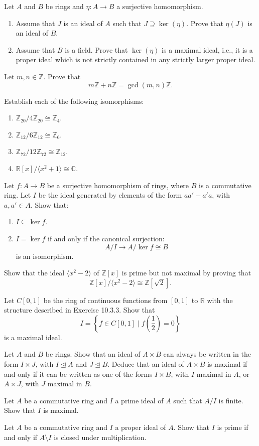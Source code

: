 \documentclass[
    11pt,a4paper,
]{exam}
\begin{document}
\begin{questions}
\question
Let $A$ and $B$ be rings and $\eta : A \to B$ a surjective homomorphism.
\begin{enumerate}[label=(\roman*)]
    \item Assume that $J$ is an ideal of $A$ such that $J \supseteq \ker(\eta)$. Prove that $\eta(J)$ is an ideal of $B$.
    \item Assume that $B$ is a field. Prove that $\ker(\eta)$ is a maximal ideal, i.e., it is a proper ideal which is not strictly contained in any strictly larger proper ideal.
\end{enumerate}

\question
Let $m, n \in \mathbb{Z}$. Prove that
\[
m\mathbb{Z} + n\mathbb{Z} = \gcd(m, n)\mathbb{Z}.
\]

\question
Establish each of the following isomorphisms:
\begin{enumerate}[label=(\roman*)]
    \item $\mathbb{Z}_{20} / 4\mathbb{Z}_{20} \cong \mathbb{Z}_4$.
    \item $\mathbb{Z}_{12} / 6\mathbb{Z}_{12} \cong \mathbb{Z}_6$.
    \item $\mathbb{Z}_{72} / 12\mathbb{Z}_{72} \cong \mathbb{Z}_{12}$.
    \item $\mathbb{R}[x] / \langle x^2 + 1 \rangle \cong \mathbb{C}$.
\end{enumerate}

\question
Let $f : A \to B$ be a surjective homomorphism of rings, where $B$ is a commutative ring. Let $I$ be the ideal generated by elements of the form $aa' - a'a$, with $a, a' \in A$. Show that:
\begin{enumerate}[label=(\roman*)]
    \item $I \subseteq \ker f$.
    \item $I = \ker f$ if and only if the canonical surjection:
    \[
    A / I \to A / \ker f \cong B
    \]
    is an isomorphism.
\end{enumerate}

\question
Show that the ideal $\langle x^2 - 2 \rangle$ of $\mathbb{Z}[x]$ is prime but not maximal by proving that
\[
\mathbb{Z}[x] / \langle x^2 - 2 \rangle \cong \mathbb{Z}[\sqrt{2}].
\]

\question
Let $C[0,1]$ be the ring of continuous functions from $[0,1]$ to $\mathbb{R}$ with the structure described in Exercise 10.3.3. Show that
\[
I = \left\{f \in C[0,1] \;\bigg|\; f\left(\frac{1}{2}\right) = 0\right\}
\]
is a maximal ideal.

\question
Let $A$ and $B$ be rings. Show that an ideal of $A \times B$ can always be written in the form $I \times J$, with $I \trianglelefteq A$ and $J \trianglelefteq B$. Deduce that an ideal of $A \times B$ is maximal if and only if it can be written as one of the forms $I \times B$, with $I$ maximal in $A$, or $A \times J$, with $J$ maximal in $B$.

\question
Let $A$ be a commutative ring and $I$ a prime ideal of $A$ such that $A/I$ is finite. Show that $I$ is maximal.

\question
Let $A$ be a commutative ring and $I$ a proper ideal of $A$. Show that $I$ is prime if and only if $A \setminus I$ is closed under multiplication.


\end{questions}
\end{document}
